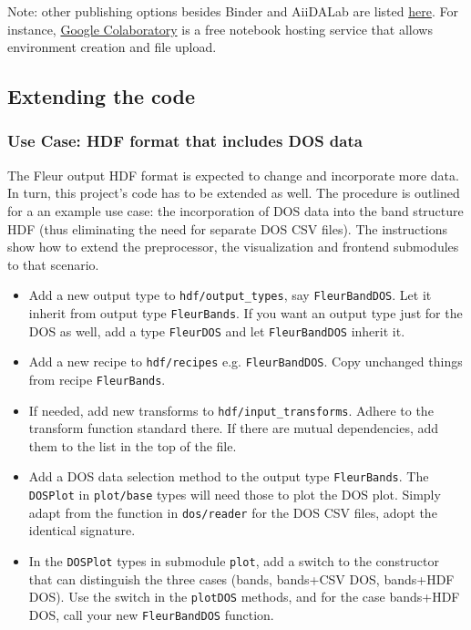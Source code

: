 Note: other publishing options besides Binder and AiiDALab are listed
\href{https://github.com/markusschanta/awesome-jupyter}{here}. For
instance, \href{http://colab.research.google.com/}{Google Colaboratory}
is a free notebook hosting service that allows environment creation and file upload.

\subsection{Extending the code}\label{extending-the-code}

\subsubsection{Use Case: HDF format that includes DOS data}
\label{sec:use-case:-hdf}


The Fleur output HDF format is expected to change and incorporate more
data. In turn, this project's code has to be extended as well. The
procedure is outlined for a an example use case: the incorporation of
DOS data into the band structure HDF (thus eliminating the need for
separate DOS CSV files). The instructions show how to extend the
preprocessor, the visualization and frontend submodules to that
scenario.

\begin{itemize}
    \tightlist
\item
    Add a new output type to \texttt{hdf/output\_types}, say
    \texttt{FleurBandDOS}. Let it inherit from output type
    \texttt{FleurBands}. If you want an output type just for the DOS as
    well, add a type \texttt{FleurDOS} and let \texttt{FleurBandDOS}
    inherit it.
\item
    Add a new recipe to \texttt{hdf/recipes} e.g. \texttt{FleurBandDOS}.
    Copy unchanged things from recipe \texttt{FleurBands}.
\item
    If needed, add new transforms to \texttt{hdf/input\_transforms}.
    Adhere to the transform function standard there. If there are mutual
    dependencies, add them to the list in the top of the file.
\item
    Add a DOS data selection method to the output type
    \texttt{FleurBands}. The \texttt{DOSPlot} in \texttt{plot/base} types
    will need those to plot the DOS plot. Simply adapt from the function
    in \texttt{dos/reader} for the DOS CSV files, adopt the identical
    signature.
\item
    In the \texttt{DOSPlot} types in submodule \texttt{plot}, add a switch
    to the constructor that can distinguish the three cases (bands,
    bands+CSV DOS, bands+HDF DOS). Use the switch in the \texttt{plotDOS}
    methods, and for the case bands+HDF DOS, call your new
    \texttt{FleurBandDOS} function.
\end{itemize}

